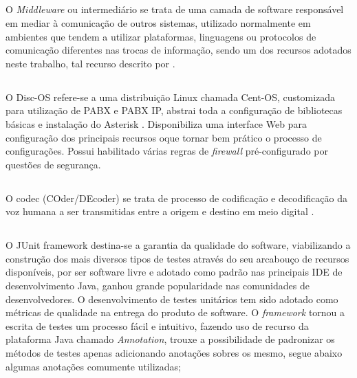 \subsection{\fontsize{12}{1} }
O \textit{Middleware} ou intermediário se trata de uma camada de software responsável em mediar à comunicação de outros sistemas, utilizado normalmente em ambientes que tendem a utilizar plataformas, linguagens ou protocolos de comunicação diferentes nas trocas de informação, sendo um dos recursos adotados neste trabalho, tal recurso descrito por .

\subsection{\fontsize{12}{1} }
O Disc-OS refere-se a uma distribuição Linux chamada Cent-OS, customizada para utilização de PABX e PABX IP, abstrai toda a configuração de bibliotecas básicas e instalação do Asterisk \cite{DARU:2008}. Disponibiliza uma interface Web para configuração dos principais recursos oque tornar bem prático o processo de configurações. Possui habilitado várias regras de \textit{firewall} pré-configurado por questões de segurança.

\subsection{\fontsize{12}{1} }
O codec (COder/DEcoder) se trata de processo de codificação e decodificação da voz humana a ser transmitidas entre a origem e destino em meio digital \cite{VIEIRA:2007}.

\subsection{\fontsize{12}{1} }
O JUnit framework destina-se a garantia da qualidade do software, viabilizando a construção dos mais diversos tipos de testes através do seu arcabouço de recursos disponíveis, por ser software livre e adotado como padrão nas principais IDE de desenvolvimento Java, ganhou grande popularidade nas comunidades de desenvolvedores. O desenvolvimento de testes unitários tem sido adotado como métricas de qualidade na entrega do produto de software.
O \textit{framework} tornou a escrita de testes um processo fácil e intuitivo, fazendo uso de recurso da plataforma Java chamado \textit{Annotation}\label{key:annotation}, trouxe a possibilidade de padronizar os métodos de testes apenas adicionando anotações sobres os mesmo, segue abaixo algumas anotações comumente utilizadas;

